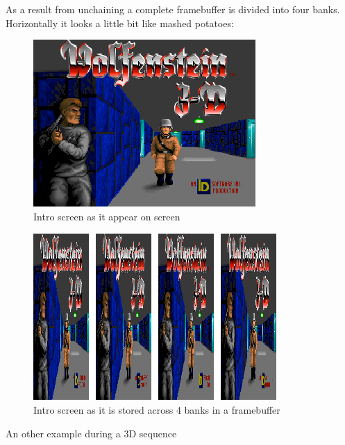 \documentclass[book.tex]{subfiles}
\begin{document}
As a result from unchaining a complete framebuffer is divided into four banks. Horizontally it looks a little bit like mashed potatoes:
 \begin{figure}[H]
\centering
 \includegraphics[width=\textwidth]{imgs/vga_layout/intro.png}
 \caption{Intro screen as it appear on screen}
 \end{figure}
 \par
 \begin{figure}[H]
\centering
 \includegraphics[width=\textwidth]{imgs/vga_layout/intro_bank.png}
 \caption{Intro screen as it is stored across 4 banks in a framebuffer} \label{fig:vga_layout_for_intro}
 \end{figure}
\par
An other example during a 3D sequence
\end{document}
